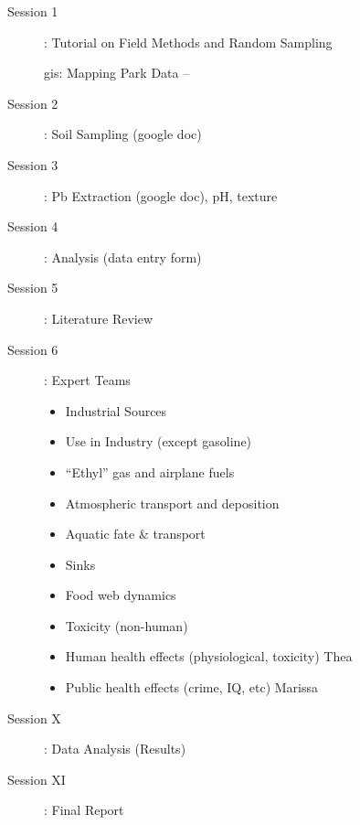 \documentclass{article}\usepackage[]{graphicx}\usepackage[]{color}
\begin{document}
\begin{description}

\item[Session 1]: Tutorial on Field Methods and Random Sampling


gis: Mapping Park Data -- 


\item[Session 2]: Soil Sampling (google doc)

\item[Session 3]: Pb Extraction (google doc), pH, texture

\item[Session 4]: Analysis (data entry form)

\item[Session 5]: Literature Review

\item[Session 6]: Expert Teams


\begin{itemize}


  \item Industrial Sources
  \item Use in Industry (except gasoline) 
  \item ``Ethyl'' gas and airplane fuels 
  \item Atmospheric transport and deposition
  \item Aquatic fate \& transport 
  \item Sinks 
  \item Food web dynamics 
  \item Toxicity (non-human) 
  \item Human health effects (physiological, toxicity) Thea
  \item Public health effects (crime, IQ, etc) Marissa
\end{itemize}

  \item[Session X]: Data Analysis (Results)


\item[Session XI]: Final Report

\end{description}
\end{document}
